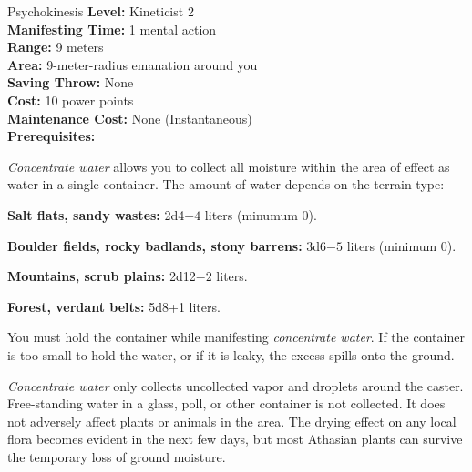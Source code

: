 {Psychokinesis}
{
	\textbf{Level:}
	Kineticist 2\\
	\textbf{Manifesting Time:}
	1 mental action\\
	\textbf{Range:}
	9 meters\\
	\textbf{Area:}
	9-meter-radius emanation around you\\
	\textbf{Saving Throw:}
	None\\
	\textbf{Cost:}
	10 power points\\
	\textbf{Maintenance Cost:}
	None (Instantaneous)\\
	\textbf{Prerequisites:}
	\\
}
{
	\emph{Concentrate water} allows you to collect all moisture within the area of effect as water in a single container. The amount of water depends on the terrain type:
	\begin{itemize*}
		\item \textbf{Salt flats, sandy wastes:} 2d4$-4$ liters (minumum 0).
		\item \textbf{Boulder fields, rocky badlands, stony barrens:} 3d6$-5$ liters (minimum 0).
		\item \textbf{Mountains, scrub plains:} 2d12$-2$ liters.
		\item \textbf{Forest, verdant belts:} 5d8+1 liters.
	\end{itemize*}

	You must hold the container while manifesting \emph{concentrate water}. If the container is too small to hold the water, or if it is leaky, the excess spills onto the ground.

	\emph{Concentrate water} only collects uncollected vapor and droplets around the caster. Free-standing water in a glass, poll, or  other container is not collected. It does not adversely affect plants or animals in the area. The drying effect on any local flora becomes evident in the next few days, but most Athasian plants can survive the temporary loss of ground moisture.
}
